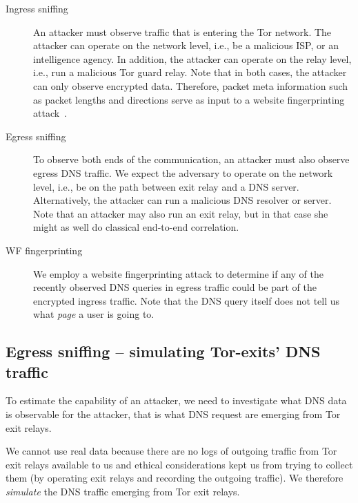 \begin{description}
	\item[Ingress sniffing] An attacker must observe traffic that is entering
		the Tor network.  The attacker can operate on the network level, i.e.,
		be a malicious ISP, or an intelligence agency.  In addition, the
		attacker can operate on the relay level, i.e., run a malicious Tor guard
		relay.  Note that in both cases, the attacker can only observe encrypted
		data.  Therefore, packet meta information such as packet lengths and
		directions serve as input to a website fingerprinting
		attack~\cite{Panchenko2016a}.
	\item[Egress sniffing] To observe both ends of the communication, an
		attacker must also observe egress DNS traffic.  We expect the adversary
		to operate on the network level, i.e., be on the path between exit relay
		and a DNS server.  Alternatively, the attacker can run a malicious DNS
		resolver or server.  Note that an attacker may also run an exit relay,
		but in that case she might as well do classical end-to-end correlation.
	\item[WF fingerprinting] We employ a website fingerprinting attack to
		determine if any of the recently observed DNS queries in egress traffic
		could be part of the encrypted ingress traffic.  Note that the DNS query
		itself does not tell us what \emph{page} a user is going to.
\end{description}

\subsection{Egress sniffing -- simulating Tor-exits' DNS traffic}
To estimate the capability of an attacker, we need to investigate what
DNS data is observable for the attacker, that is what DNS request are
emerging from Tor exit relays.

We cannot use real data because there are no logs of outgoing traffic
from Tor exit relays available to us and ethical considerations kept us
from trying to collect them (\eg by operating exit relays and recording
the outgoing traffic). We therefore \emph{simulate} the DNS traffic
emerging from Tor exit relays. 


